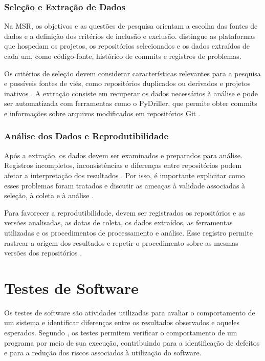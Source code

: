 \subsubsection{Seleção e Extração de Dados}

Na MSR, os objetivos e as questões de pesquisa orientam a escolha das fontes de dados e a definição dos critérios de inclusão e exclusão.  distingue as plataformas que hospedam os projetos, os repositórios selecionados e os dados extraídos de cada um, como código-fonte, histórico de commits e registros de problemas.

Os critérios de seleção devem considerar características relevantes para a pesquisa e possíveis fontes de viés, como repositórios duplicados ou derivados e projetos inativos \cite{vidoni2022}. A extração consiste em recuperar os dados necessários à análise e pode ser automatizada com ferramentas como o PyDriller, que permite obter commits e informações sobre arquivos modificados em repositórios Git \cite{spadini2018}.

\subsubsection{Análise dos Dados e Reprodutibilidade}

Após a extração, os dados devem ser examinados e preparados para análise. Registros incompletos, inconsistências e diferenças entre repositórios podem afetar a interpretação dos resultados \cite{hassan2008}. Por isso, é importante explicitar como esses problemas foram tratados e discutir as ameaças à validade associadas à seleção, à coleta e à análise \cite{vidoni2022}.

Para favorecer a reprodutibilidade, devem ser registrados os repositórios e as versões analisadas, as datas de coleta, os dados extraídos, as ferramentas utilizadas e os procedimentos de processamento e análise. Esse registro permite rastrear a origem dos resultados e repetir o procedimento sobre as mesmas versões dos repositórios \cite{vidoni2022}.

\section{Testes de Software}

Os testes de software são atividades utilizadas para avaliar o comportamento de um sistema e identificar diferenças entre os resultados observados e aqueles esperados. Segundo , os testes permitem verificar o comportamento de um programa por meio de sua execução, contribuindo para a identificação de defeitos e para a redução dos riscos associados à utilização do software.

